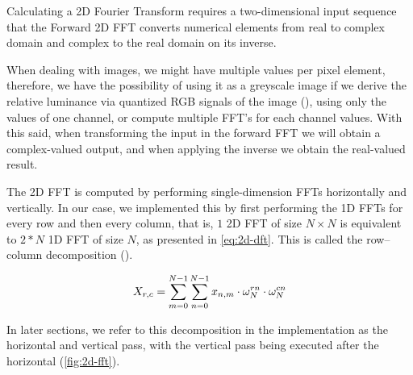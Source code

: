 \documentclass[
  oneside,
  11pt, a4paper,
  footinclude=true,
  headinclude=true,
  cleardoublepage=empty
]{scrbook}
\begin{document}
Calculating a 2D Fourier Transform requires a two-dimensional input sequence that the Forward 2D FFT converts numerical elements from real to complex domain and complex to the real domain on its inverse.

When dealing with images, we might have multiple values per pixel element, therefore, we have the possibility of using it as a greyscale image if we derive the relative luminance via quantized RGB signals of the image (\cite{itu2002parameter}), using only the values of one channel, or compute multiple FFT's for each channel values. With this said, when transforming the input in the forward FFT we will obtain a complex-valued output, and when applying the inverse we obtain the real-valued result.
\newline



The 2D FFT is computed by performing single-dimension FFTs horizontally and vertically. In our case, we implemented this by first performing the 1D FFTs for every row and then every column, that is, $1$ 2D FFT of size $N \times N$ is equivalent to $2*N$ 1D FFT of size $N$, as presented in \autoref{eq:2d-dft}. This is called the row–column decomposition (\cite{mermer2003efficient}).

\begin{equation} \label{eq:2d-dft}
        X_{r,c} = \sum_{m=0}^{N-1} \sum_{n=0}^{N-1} x_{n,m} \cdot \omega_{N}^{rn} \cdot \omega_{N}^{cn} \\
\end{equation}

In later sections, we refer to this decomposition in the implementation as the horizontal and vertical pass, with the vertical pass being executed after the horizontal (\autoref{fig:2d-fft}).

\end{document}
